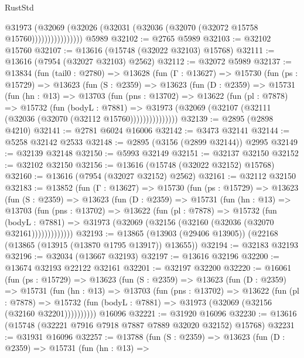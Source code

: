 \begin{lexlean}{RustStd}
\begin{coremodule}
                      @31973
                        (@32069
                          (@32026 (@32031 (@32036 (@32070 (@32072 @15758 @15760))))))))))))))))
    @5989
@32102 := @2765 @5989
@32103 := @32102 @15760
@32107 := @13616 (@15748 (@32022 @32103) @15768)
@32111 := @13616 (@7954 (@32027 @32103) @2562)
@32112 := @32072 @5989
@32137 := @13834
    (fun (tail0 : @2780) =>
    @13628
      (fun (Γ : @13627) =>
      @15730
        (fun (ps : @15729) =>
        @13623
          (fun (S : @2359) =>
          @13623
            (fun (D : @2359) =>
            @15731
              (fun (hn : @13) =>
              @13703
                (fun (pns : @13702) =>
                @13622
                  (fun (pl : @7878) =>
                  @15732
                    (fun (bodyL : @7881) =>
                    @31973 (@32069 (@32107 (@32111 (@32036 (@32070 (@32112 @15760)))))))))))))))
@32139 := @2895 (@2898 @4210)
@32141 := @2781 @6024 @16006
@32142 := @3473 @32141
@32144 := @5258 @32142 @2533
@32148 := @2895 (@3156 (@2899 @32144)) @2995
@32149 := @32139 @32148
@32150 := @5993 @32149
@32151 := @32137 @32150
@32152 := @32102 @32150
@32156 := @13616 (@15748 (@32022 @32152) @15768)
@32160 := @13616 (@7954 (@32027 @32152) @2562)
@32161 := @32112 @32150
@32183 := @13852
    (fun (Γ : @13627) =>
    @15730
      (fun (ps : @15729) =>
      @13623
        (fun (S : @2359) =>
        @13623
          (fun (D : @2359) =>
          @15731
            (fun (hn : @13) =>
            @13703
              (fun (pns : @13702) =>
              @13622
                (fun (pl : @7878) =>
                @15732
                  (fun (bodyL : @7881) =>
                  @31973 (@32069 (@32156 (@32160 (@32036 (@32070 @32161)))))))))))))
@32193 := @13865 (@13903 (@29406 @13905)) (@22168 (@13865 (@13915 (@13870 @1795 @13917)) @13655))
@32194 := @32183 @32193
@32196 := @32034 (@13667 @32193)
@32197 := @13616 @32196
@32200 := @13674 @32193 @22122 @32161
@32201 := @32197 @32200
@32220 := @16061
    (fun (ps : @15729) =>
    @13623
      (fun (S : @2359) =>
      @13623
        (fun (D : @2359) =>
        @15731
          (fun (hn : @13) =>
          @13703
            (fun (pns : @13702) =>
            @13622
              (fun (pl : @7878) =>
              @15732 (fun (bodyL : @7881) => @31973 (@32069 (@32156 (@32160 @32201))))))))))
    @16096
@32221 := @31920 @16096
@32230 := @13616 (@15748 (@32221 @7916 @7918 @7887 @7889 @32020 @32152) @15768)
@32231 := @31931 @16096
@32257 := @13788
    (fun (S : @2359) =>
    @13623
      (fun (D : @2359) =>
      @15731
        (fun (hn : @13) =>

\end{coremodule}
\end{lexlean}
